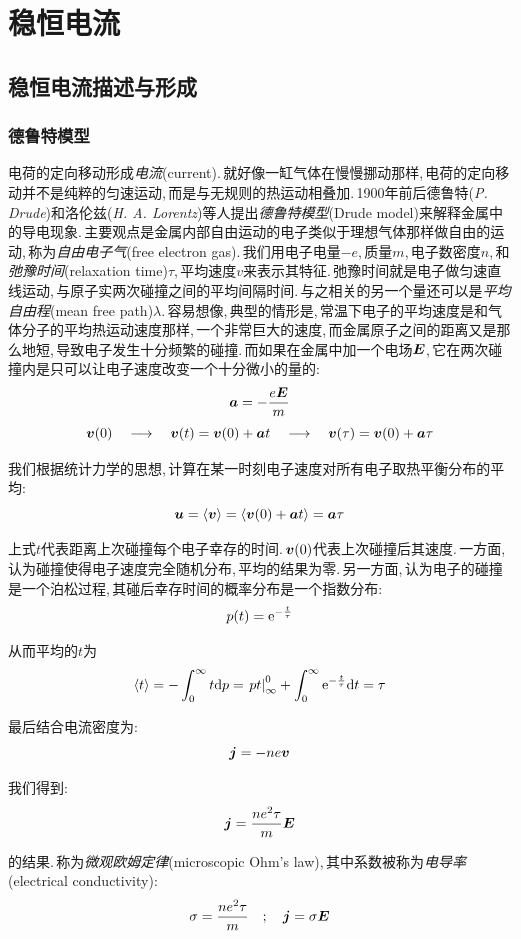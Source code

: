 \chapter{稳恒电流}


\section{稳恒电流描述与形成}
\subsection{德鲁特模型}
电荷的定向移动形成\emph{电流}(current).\,就好像一缸气体在慢慢挪动那样,\,电荷的定向移动并不是纯粹的匀速运动,\,而是与无规则的热运动相叠加.\,1900年前后德鲁特({\it P. Drude})和洛伦兹({\it H. A. Lorentz})等人提出\emph{德鲁特模型}(Drude model)来解释金属中的导电现象.\,主要观点是金属内部自由运动的电子类似于理想气体那样做自由的运动,\,称为\emph{自由电子气}(free electron gas).\,我们用电子电量$-e$,\,质量$m$,\,电子数密度$n$,\,和\emph{弛豫时间}(relaxation time)$\tau$,\,平均速度$v$来表示其特征.\,弛豫时间就是电子做匀速直线运动,\,与原子实两次碰撞之间的平均间隔时间.\,与之相关的另一个量还可以是\emph{平均自由程}(mean free path)$\lambda$.\,容易想像,\,典型的情形是,\,常温下电子的平均速度是和气体分子的平均热运动速度那样,\,一个非常巨大的速度,\,而金属原子之间的距离又是那么地短,\,导致电子发生十分频繁的碰撞.\,而如果在金属中加一个电场$\boldsymbol{E}$,\,它在两次碰撞内是只可以让电子速度改变一个十分微小的量的:
\[\boldsymbol{a}=-\frac{e\boldsymbol{E}}{m}\]
\[\boldsymbol{v}(0)\quad\longrightarrow\quad\boldsymbol{v}(t)=\boldsymbol{v}(0)+\boldsymbol{a}t\quad\longrightarrow\quad\boldsymbol{v}(\tau)=\boldsymbol{v}(0)+\boldsymbol{a}\tau\]

我们根据统计力学的思想,\,计算在某一时刻电子速度对所有电子取热平衡分布的平均:
\[\boldsymbol{u}=\langle\boldsymbol{v}\rangle=\langle\boldsymbol{v}(0) +\boldsymbol{a}t\rangle = \boldsymbol{a}\tau\]

上式$t$代表距离上次碰撞每个电子幸存的时间.\,$\boldsymbol{v}(0)$代表上次碰撞后其速度.\,一方面,\,认为碰撞使得电子速度完全随机分布,\,平均的结果为零.\,另一方面,\,认为电子的碰撞是一个泊松过程,\,其碰后幸存时间的概率分布是一个指数分布:
\[p(t)={\rm e}^{-\frac{t}{\tau}}\]

从而平均的$t$为
\[\langle t\rangle=-\int_0^\infty t\textrm{d} p=\left. pt\right|^0_\infty+\int_0^\infty {\rm e}^{-\frac{t}{\tau}} \textrm{d} t=\tau\]

最后结合电流密度为:
\[\boldsymbol{j}=-ne\boldsymbol{v}\]

我们得到:
\[\boldsymbol{j}=\frac{ne^2 \tau}{m}\boldsymbol{E}\]

的结果.\,称为\emph{微观欧姆定律}(microscopic Ohm's law),\,其中系数被称为\emph{电导率}(electrical conductivity):
\[\sigma=\frac{ne^2 \tau}{m}\quad;\quad \boldsymbol{j}=\sigma\boldsymbol{E}\]

